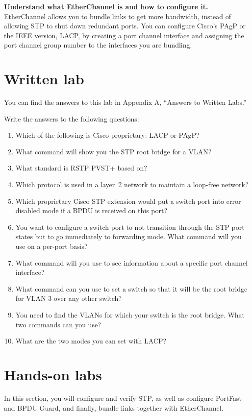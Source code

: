 \textbf{Understand what EtherChannel is and how to configure it.}
EtherChannel allows you to bundle links to get more bandwidth, instead
of allowing STP to shut down redundant ports. You can configure Cisco's
PAgP or the IEEE version, LACP, by creating a port channel interface and
assigning the port channel group number to the interfaces you are
bundling.

\section{Written lab}

You can find the answers to this lab in Appendix A, ``Answers to Written
Labs.''

Write the answers to the following questions:

\begin{enumerate}
\tightlist
\item
  Which of the following is Cisco proprietary: LACP or PAgP?
\item
  What command will show you the STP root bridge for a VLAN?
\item
  What standard is
  RSTP PVST+ based on?
\item
  Which protocol is used in a layer~2 network to maintain a loop-free
  network?
\item
  Which proprietary Cisco STP extension would put a switch port into
  error disabled mode if a BPDU is received on this port?
\item
  You want to configure a switch port to not transition through the STP
  port states but to go immediately to forwarding mode. What command
  will you use on a per-port basis?
\item
  What command will you use to see information about a specific port
  channel interface?
\item
  What command can you use to set a switch so that it will be the root
  bridge for VLAN 3 over any other switch?
\item
  You need to find the VLANs for which your switch is the root bridge.
  What two commands can you use?
\item
  What are the two modes you can set with LACP?
\end{enumerate}

\section{Hands-on labs}

In this section, you will configure and verify STP, as well as configure
PortFast and BPDU Guard, and finally, bundle links together with
EtherChannel.


